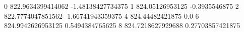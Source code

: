 0 822.9634399414062 -1.48138427734375
1 824.05126953125 -0.3935546875
2 822.7774047851562 -1.66741943359375
4 824.44482421875 0.0
6 824.9942626953125 0.5494384765625
8 824.7218627929688 0.27703857421875
